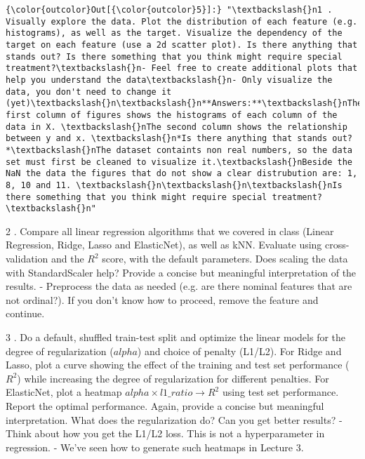 \documentclass[11pt]{article}
\begin{document}
\begin{Verbatim}[commandchars=\\\{\}]
{\color{outcolor}Out[{\color{outcolor}5}]:} "\textbackslash{}n1 . Visually explore the data. Plot the distribution of each feature (e.g. histograms), as well as the target. Visualize the dependency of the target on each feature (use a 2d scatter plot). Is there anything that stands out? Is there something that you think might require special treatment?\textbackslash{}n- Feel free to create additional plots that help you understand the data\textbackslash{}n- Only visualize the data, you don't need to change it (yet)\textbackslash{}n\textbackslash{}n**Answers:**\textbackslash{}nThe first column of figures shows the histograms of each column of the data in X. \textbackslash{}nThe second column shows the relationship between y and x. \textbackslash{}n*Is there anything that stands out?*\textbackslash{}nThe dataset containts non real numbers, so the data set must first be cleaned to visualize it.\textbackslash{}nBeside the NaN the data the figures that do not show a clear distrubution are: 1, 8, 10 and 11. \textbackslash{}n\textbackslash{}n\textbackslash{}nIs there something that you think might require special treatment?\textbackslash{}n"
\end{Verbatim}
            
    2 . Compare all linear regression algorithms that we covered in class
(Linear Regression, Ridge, Lasso and ElasticNet), as well as kNN.
Evaluate using cross-validation and the \(R^2\) score, with the default
parameters. Does scaling the data with StandardScaler help? Provide a
concise but meaningful interpretation of the results. - Preprocess the
data as needed (e.g. are there nominal features that are not ordinal?).
If you don't know how to proceed, remove the feature and continue.

    3 . Do a default, shuffled train-test split and optimize the linear
models for the degree of regularization (\(alpha\)) and choice of
penalty (L1/L2). For Ridge and Lasso, plot a curve showing the effect of
the training and test set performance (\(R^2\)) while increasing the
degree of regularization for different penalties. For ElasticNet, plot a
heatmap \(alpha \times l1\_ratio \rightarrow R^2\) using test set
performance. Report the optimal performance. Again, provide a concise
but meaningful interpretation. What does the regularization do? Can you
get better results? - Think about how you get the L1/L2 loss. This is
not a hyperparameter in regression. - We've seen how to generate such
heatmaps in Lecture 3.
\end{document}
